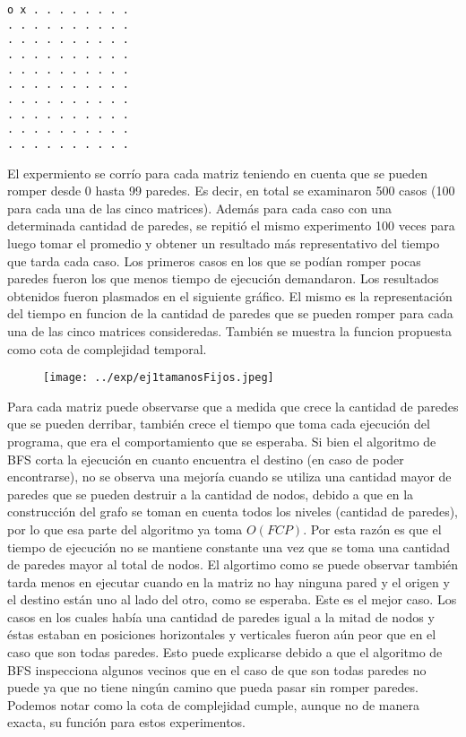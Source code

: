 \begin{itemize}
\begin{codesnippet}
\begin{verbatim}
o x . . . . . . . .
. . . . . . . . . .
. . . . . . . . . .
. . . . . . . . . .
. . . . . . . . . .
. . . . . . . . . .
. . . . . . . . . .
. . . . . . . . . .
. . . . . . . . . .
. . . . . . . . . .

\end{verbatim}
            \end{codesnippet}

  El expermiento se corrío para cada matriz teniendo en cuenta que se pueden romper desde 0 hasta 99 paredes. Es decir, en total se examinaron 500 casos (100 para cada una de las cinco matrices). Además para cada caso con una determinada cantidad de paredes, se repitió el mismo experimento 100 veces para luego tomar el promedio y obtener un resultado más representativo del tiempo que tarda cada caso. Los primeros casos en los que se podían romper pocas paredes fueron los que menos tiempo de ejecución demandaron.
  Los resultados obtenidos fueron plasmados en el siguiente gráfico. El mismo es la representación del tiempo en funcion de la cantidad de paredes que se pueden romper para cada una de las cinco matrices consideredas. También se muestra la funcion propuesta como cota de complejidad temporal.

  \begin{figure}[H]
      \begin{center}
        \texttt{[image: ../exp/ej1tamanosFijos.jpeg]}
        \caption{}
      \end{center}
  \end{figure}

  Para cada matriz puede observarse que a medida que crece la cantidad de paredes que se pueden derribar, también crece el tiempo que toma cada ejecución del programa, que era el comportamiento que se esperaba. Si bien el algoritmo de BFS corta la ejecución en cuanto encuentra el destino (en caso de poder encontrarse), no se observa una mejoría cuando se utiliza una cantidad mayor de paredes que se pueden destruir a la cantidad de nodos, debido a que en la construcción del grafo se toman en cuenta todos los niveles (cantidad de paredes), por lo que esa parte del algoritmo ya toma $O(FCP)$. Por esta razón es que el tiempo de ejecución no se mantiene constante una vez que se toma una cantidad de paredes mayor al total de nodos. El algortimo como se puede observar también tarda menos en ejecutar cuando en la matriz no hay ninguna pared y el origen y el destino están uno al lado del otro, como se esperaba. Este es el mejor caso. Los casos en los cuales había una cantidad de paredes igual a la mitad de nodos y éstas estaban en posiciones horizontales y verticales fueron aún peor que en el caso que son todas paredes. Esto puede explicarse debido a que el algoritmo de BFS inspecciona algunos vecinos que en el caso de que son todas paredes no puede ya que no tiene ningún camino que pueda pasar sin romper paredes.
  Podemos notar como la cota de complejidad cumple, aunque no de manera exacta, su función para estos experimentos.



\end{itemize}
